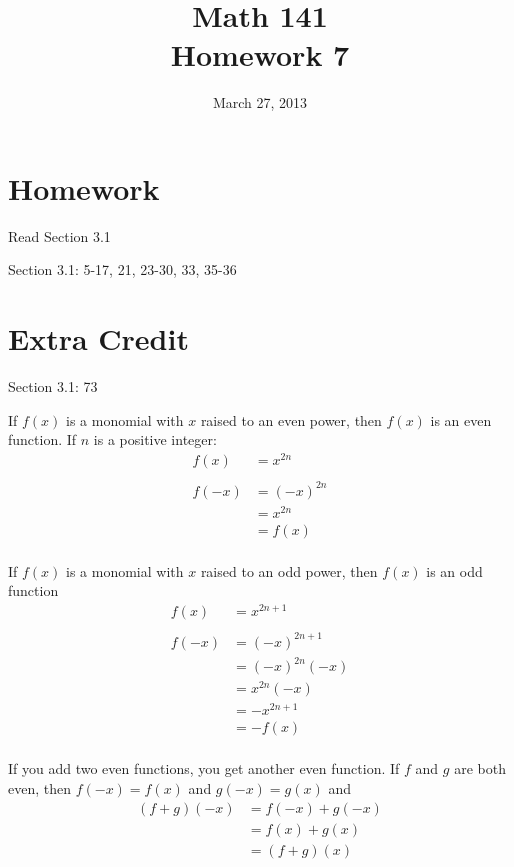 \documentclass{exam}
\date{March 27, 2013}
\author{}
\title{Math 141 \\ Homework 7}
\begin{document}
\maketitle

\section{Homework}

\begin{itemize*}
  \item Read Section 3.1
  \item Section 3.1: 5-17, 21, 23-30, 33, 35-36
\end{itemize*}

\ifprintanswers
  \pagebreak
\fi

\section{Extra Credit}
Section 3.1: 73

\ifprintanswers

  If $f(x)$ is a monomial with $x$ raised to an even power, then $f(x)$ is an even function.  If $n$ is a positive
  integer:
  \begin{align*}
    f(x)  &= x^{2n} \\
    \\
    f(-x) &= (-x)^{2n} \\
          &= x^{2n} \\
          &= f(x) \\
  \end{align*}

  If $f(x)$ is a monomial with $x$ raised to an odd power, then $f(x)$ is an odd function
  \begin{align*}
    f(x)  &= x^{2n + 1} \\
    \\
    f(-x) &= (-x)^{2n + 1} \\
          &= (-x)^{2n} (-x) \\
          &= x^{2n} (-x) \\
          &= -x^{2n + 1} \\
          &= -f(x) \\
  \end{align*}

  If you add two even functions, you get another even function.  If $f$ and $g$ are both even, then $f(-x) = f(x)$ and
  $g(-x) = g(x)$ and
  \begin{align*}
    (f + g)(-x) &= f(-x) + g(-x) \\
                &= f(x) + g(x) \\
                &= (f + g)(x) \\
  \end{align*}
\end{document}
